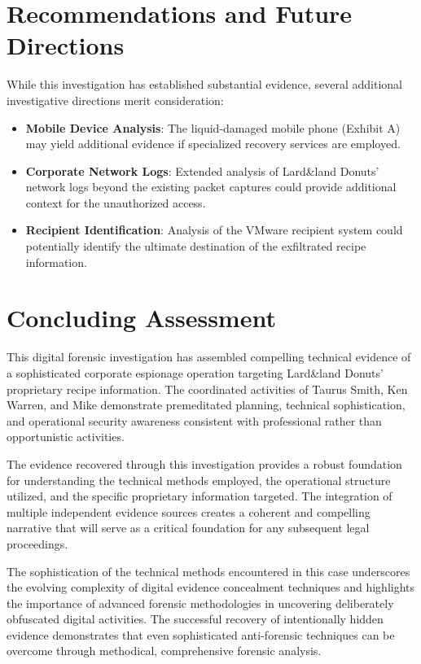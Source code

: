 \section{Recommendations and Future Directions}

While this investigation has established substantial evidence, several additional investigative directions merit consideration:

\begin{itemize}
    \item \textbf{Mobile Device Analysis}: The liquid-damaged mobile phone (Exhibit A) may yield additional evidence if specialized recovery services are employed.
    
    \item \textbf{Corporate Network Logs}: Extended analysis of Lard\&land Donuts' network logs beyond the existing packet captures could provide additional context for the unauthorized access.
    
    \item \textbf{Recipient Identification}: Analysis of the VMware recipient system could potentially identify the ultimate destination of the exfiltrated recipe information.
\end{itemize}

\section{Concluding Assessment}
This digital forensic investigation has assembled compelling technical evidence of a sophisticated corporate espionage operation targeting Lard\&land Donuts' proprietary recipe information. The coordinated activities of Taurus Smith, Ken Warren, and Mike demonstrate premeditated planning, technical sophistication, and operational security awareness consistent with professional rather than opportunistic activities.

The evidence recovered through this investigation provides a robust foundation for understanding the technical methods employed, the operational structure utilized, and the specific proprietary information targeted. The integration of multiple independent evidence sources creates a coherent and compelling narrative that will serve as a critical foundation for any subsequent legal proceedings.

The sophistication of the technical methods encountered in this case underscores the evolving complexity of digital evidence concealment techniques and highlights the importance of advanced forensic methodologies in uncovering deliberately obfuscated digital activities. The successful recovery of intentionally hidden evidence demonstrates that even sophisticated anti-forensic techniques can be overcome through methodical, comprehensive forensic analysis.